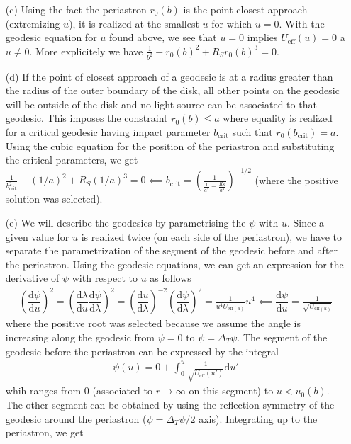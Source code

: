 \documentclass[10pt, a4paper]{article}
\begin{document}
\begin{enumerate}
  \newpage
  \item[(c)] Using the fact the periastron $r_0(b)$ is the point closest approach (extremizing $u$), it is realized at the smallest $u$ for which $\dot{u} = 0$. With the geodesic equation for $\dot{u}$ found above, we see that $\dot{u} = 0$ implies $U_{\text{eff}}(u) = 0$ a $u \neq 0$. More explicitely we have $\frac{1}{b^2}-r_0(b)^2+R_S r_0(b)^3 = 0$. 
  \item[(d)] If the point of closest approach of a geodesic is at a radius greater than the radius of the outer boundary of the disk, all other points on the geodesic will be outside of the disk and no light source can be associated to that geodesic. This imposes the constraint $r_0(b) \leq a$ where equality is realized for a critical geodesic having impact parameter $b_{\text{crit}}$ such that $r_0(b_{\text{crit}}) = a$. Using the cubic equation for the position of the periastron and substituting the critical parameters, we get $\frac{1}{b_{\text{crit}}^2}-(1/a)^2+R_S (1/a)^3 = 0 \impliedby b_{\text{crit}} = \left(\frac{1}{\frac{1}{a^2}-\frac{R_S}{a^3}}\right)^{-1/2}$ (where the positive solution was selected). 
  \item[(e)] We will describe the geodesics by parametrising the $\psi$ with $u$. Since a given value for $u$ is realized twice (on each side of the periastron), we have to separate the parametrization of the segment of the geodesic before and after the periastron. Using the geodesic equations, we can get an expression for the derivative of $\psi$ with respect to $u$ as follows 
  \begin{align*}
    \left(\dfrac{\text{d}\psi}{\text{d}u}\right)^2 = \left(\dfrac{\text{d}\lambda}{\text{d}u}\dfrac{\text{d}\psi}{\text{d}\lambda}\right)^2 =  \left(\dfrac{\text{d}u}{\text{d}\lambda}\right)^{-2} \left(\dfrac{\text{d}\psi}{\text{d}\lambda}\right)^2 = \frac{1}{u^4 U_{\text{eff}(u)}} u^4 \impliedby \dfrac{\text{d}\psi}{\text{d}u} = \frac{1}{\sqrt{U_{\text{eff}(u)}}}
  \end{align*} 
  where the positive root was selected because we assume the angle is increasing along the geodesic from $\psi = 0$ to $\psi = \Delta_T \psi$. The segment of the geodesic before the periastron can be expressed by the integral
  \begin{align*}
    \psi(u) = 0+\int_{0}^{u} \frac{1}{\sqrt{U_{\text{eff}}(u')}}\text{d}u'
  \end{align*}
  whih ranges from $0$ (associated to $r\to \infty$ on this segment) to $u<u_0(b)$. The other segment can be obtained by using the reflection symmetry of the geodesic around the periastron ($\psi = \Delta_T \psi/2$ axis). Integrating up to the periastron, we get 

\end{enumerate}
\end{document}

